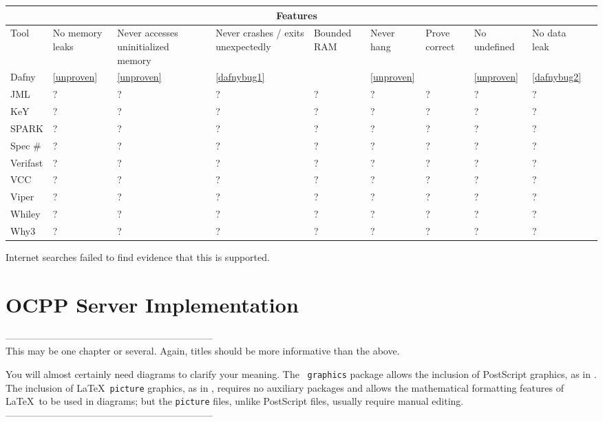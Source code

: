 \documentclass[12pt,openany,a4paper]{book}
\begin{document}
\begin{tabular}{ |p{1.3cm}||p{1.5cm}|p{1.5cm}|p{1.5cm}| p{1.5cm}|p{1.5cm}|p{1.5cm}|p{1cm}|p{1cm}| p{1cm}| }
 \hline
 \multicolumn{9}{|c|}{Features} \\
 \hline
Tool & 
No memory leaks & 
Never accesses uninitialized memory & 
Never crashes / exits unexpectedly &
Bounded
RAM &
Never hang &
Prove correct &
No undefined &
No data leak 
\\
 \hline
Dafny 		& \cellcolor{red} \ref{unproven} & \cellcolor{red} \ref{unproven} & \cellcolor{red} \ref{dafnybug1} & \cellcolor{red} & \cellcolor{red} \ref{unproven} & \cellcolor{green} & \cellcolor{red} \ref{unproven}  & \cellcolor{red} \ref{dafnybug2} \\
 \hline
JML   		& ? & ? & ?& ?& ?& ?& ?& ?\\
 \hline
KeY 		& ? & ? & ?& ?& ?& ?& ?& ?\\
 \hline
SPARK		& ? & ? & ?& ?& ?& ?& ?& ?\\
 \hline
Spec \#		& ? & ? & ?& ?& ?& ?& ?& ?\\
 \hline
Verifast& ? & ? & ?& ?& ?& ?& ?& ?\\
 \hline
VCC& ? & ? & ?& ?& ?& ?& ?& ?\\
 \hline
Viper& ? & ? & ?& ?& ?& ?& ?& ?\\
 \hline
Whiley& ? & ? & ?& ?& ?& ?& ?& ?\\
 \hline
Why3& ? & ? & ?& ?& ?& ?& ?& ?\\
 \hline
\end{tabular}

\label{unproven} Internet searches failed to find evidence that this is supported.










\chapter{OCPP Server Implementation}
-----------------------------------------------------------------\\
This may be one chapter or several.  Again, titles should be more
informative than the above.

You will almost certainly need diagrams to clarify your meaning.  The
\LaTeXe\ \texttt{graphics} package allows the inclusion of PostScript
graphics, as in .  The inclusion of \LaTeX\ \texttt{picture}
graphics, as in , requires no auxiliary packages and allows
the mathematical formatting features of \LaTeX\ to be used in
diagrams; but the \texttt{picture} files, unlike PostScript files,
usually require manual editing.\\
-----------------------------------------------------------------\\
\end{document}

